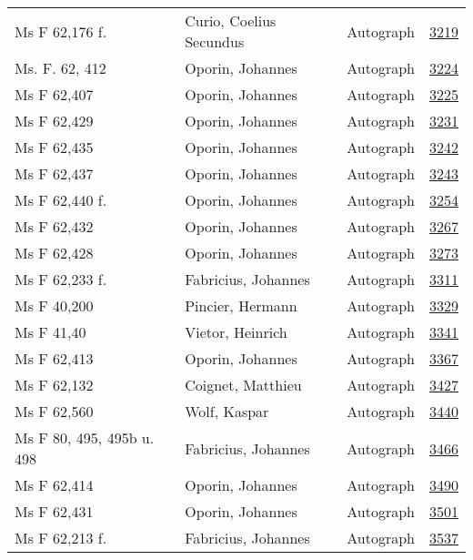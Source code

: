 \documentclass[10pt,a4paper,landscape]{report}
\begin{document}
\begin{longtable}{p{16cm}p{4cm}lr}
Ms F 62,176 f.	&	Curio, Coelius Secundus	&	Autograph	&	\href{http://130.60.24.72/assignment/3219}{3219}\\
Ms. F. 62, 412	&	Oporin, Johannes	&	Autograph	&	\href{http://130.60.24.72/assignment/3224}{3224}\\
Ms F 62,407	&	Oporin, Johannes	&	Autograph	&	\href{http://130.60.24.72/assignment/3225}{3225}\\
Ms F 62,429	&	Oporin, Johannes	&	Autograph	&	\href{http://130.60.24.72/assignment/3231}{3231}\\
Ms F 62,435	&	Oporin, Johannes	&	Autograph	&	\href{http://130.60.24.72/assignment/3242}{3242}\\
Ms F 62,437	&	Oporin, Johannes	&	Autograph	&	\href{http://130.60.24.72/assignment/3243}{3243}\\
Ms F 62,440 f.	&	Oporin, Johannes	&	Autograph	&	\href{http://130.60.24.72/assignment/3254}{3254}\\
Ms F 62,432	&	Oporin, Johannes	&	Autograph	&	\href{http://130.60.24.72/assignment/3267}{3267}\\
Ms F 62,428	&	Oporin, Johannes	&	Autograph	&	\href{http://130.60.24.72/assignment/3273}{3273}\\
Ms F 62,233 f.	&	Fabricius, Johannes	&	Autograph	&	\href{http://130.60.24.72/assignment/3311}{3311}\\
Ms F 40,200	&	Pincier, Hermann	&	Autograph	&	\href{http://130.60.24.72/assignment/3329}{3329}\\
Ms F 41,40	&	Vietor, Heinrich	&	Autograph	&	\href{http://130.60.24.72/assignment/3341}{3341}\\
Ms F 62,413	&	Oporin, Johannes	&	Autograph	&	\href{http://130.60.24.72/assignment/3367}{3367}\\
Ms F 62,132	&	Coignet, Matthieu	&	Autograph	&	\href{http://130.60.24.72/assignment/3427}{3427}\\
Ms F 62,560	&	Wolf, Kaspar	&	Autograph	&	\href{http://130.60.24.72/assignment/3440}{3440}\\
Ms F 80, 495, 495b u. 498	&	Fabricius, Johannes	&	Autograph	&	\href{http://130.60.24.72/assignment/3466}{3466}\\
Ms F 62,414	&	Oporin, Johannes	&	Autograph	&	\href{http://130.60.24.72/assignment/3490}{3490}\\
Ms F 62,431	&	Oporin, Johannes	&	Autograph	&	\href{http://130.60.24.72/assignment/3501}{3501}\\
Ms F 62,213 f.	&	Fabricius, Johannes	&	Autograph	&	\href{http://130.60.24.72/assignment/3537}{3537}\\

\end{longtable}
\end{document}
